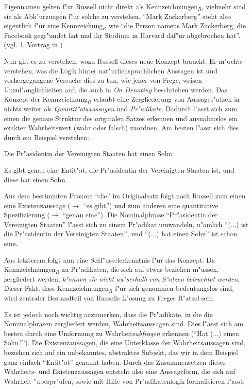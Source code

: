 \documentclass[a4paper, emulatestandardclasses, 12pt]{scrartcl}
\begin{document}
\begin{onehalfspace}
Eigennamen gelten f"ur Russell nicht direkt als Kennzeichnungen$_{R}$, vielmehr sind sie als Abk"urzungen f"ur solche zu verstehen. "`Mark Zuckerberg"' steht also eigentlich f"ur eine Kennzeichung$_{R}$ wie "`die Person namens Mark Zuckerberg, die Facebook gegr"undet hat und ihr Studium in Harvard daf"ur abgebrochen hat"'. (vgl. 1. Vortrag in \cite{kripke1972naming})

Nun gilt es zu verstehen, wozu Russell dieses neue Konzept braucht. Er m"ochte verstehen, was die Logik hinter nat"urlichsprachlichen Aussagen ist und vorhergegangene Versuche dies zu tun, wie jener von Frege, weisen Unzul"anglichkeiten auf, die auch in \emph{On Denoting} beschrieben werden. Das Konzept der Kennzeichnung$_{R}$ erlaubt eine Zergliederung von Aussages"atzen in nichts weiter als \emph{Quantit"atsaussagen} und \emph{Pr"adikate}. Dadurch l"asst sich zum einen die genaue Struktur des originalen Satzes erkennen und ausnahmslos ein exakter Wahrheitswert (wahr oder falsch) zuordnen. Am besten l"asst sich dies durch ein Beispiel verstehen:

\begin{description}[leftmargin=!,labelwidth=\widthof{\bfseries Zergliederung}]
    \item[Originalsatz] Die Pr"asidentin der Vereinigten Staaten hat einen Sohn.
    \item[Zergliederung] Es gibt genau eine Entit"at, die Pr"asidentin der Vereinigten Staaten ist, und diese hat einen Sohn. 
\end{description}

Aus dem bestimmten Pronom "`die"' im Originalsatz folgt nach Russell zum einen eine Existenzaussage ($\rightarrow$ "`es gibt"') und zum anderen eine quantitative Spezifizierung ($\rightarrow$ "`genau eine"'). Die Nominalphrase "`Pr"asidentin der Vereinigten Staaten"' l"asst sich zu einem Pr"adikat umwandeln, n"amlich "`(...) ist die Pr"asidentin der Vereinigten Staaten"', und "`(...) hat einen Sohn"' ist schon eine.

Aus letzterem folgt nun eine Schl"usselerkenntnis f"ur das Konzept: Da Kennzeichnungen$_{R}$  zu Pr"adikaten, die sich auf etwas beziehen m"ussen, zergliedert werden, \emph{k"onnen sie nicht au"serhalb von S"atzen betrachtet werden}. Dieser Fakt, dass Kennzeichnungen$_{R}$ f"ur sich genommen bedeutungslos sind, wird zentraler Bestandteil von Russells L"osung zu Freges R"atsel sein. 

Es ist jedoch noch wichtig anzumerken, dass die Pr"adikate, in die die Nominalphrasen zergliedert werden, Wahrheitsaussagen sind. Dies l"asst sich am besten durch eine Umformung zu Wahrheits\emph{abfragen} erkennen ("`Hat (...) einen Sohn?"'). Die Existenzaussagen, die eine Unterklasse der Wahrheitsaussagen sind, beziehen sich auf ein unbekanntes, abstraktes Subjekt, das wir in dem Beispiel ganz einfach "`Entit"at"' genannt haben. Durch das Zusammensetzen dieser Wahrheits- und Existenzaussagen entsteht also eine Aussageform, die sich auf Wahrheit "uberpr"ufen, sowie mit Hilfe von Pr"adikatenlogik formalisieren l"asst.


\end{onehalfspace}
\end{document}
